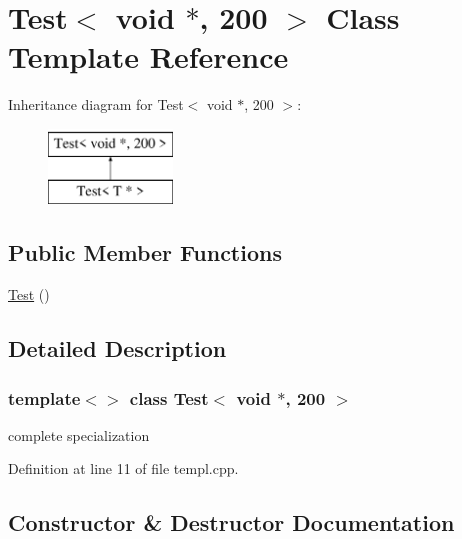 \hypertarget{class_test_3_01void_01_5_00_01200_01_4}{}\section{Test$<$ void $\ast$, 200 $>$ Class Template Reference}
\label{class_test_3_01void_01_5_00_01200_01_4}
Inheritance diagram for Test$<$ void $\ast$, 200 $>$\+:\begin{figure}[H]
\begin{center}
\leavevmode
\includegraphics[height=2.000000cm]{class_test_3_01void_01_5_00_01200_01_4}
\end{center}
\end{figure}
\subsection*{Public Member Functions}
\begin{DoxyCompactItemize}
\item 
\hyperlink{class_test_3_01void_01_5_00_01200_01_4_a350e5417b9f48c2f7b98937514b03da2}{Test} ()
\end{DoxyCompactItemize}


\subsection{Detailed Description}
\subsubsection*{template$<$$>$\newline
class Test$<$ void $\ast$, 200 $>$}

complete specialization 

Definition at line 11 of file templ.\+cpp.



\subsection{Constructor \& Destructor Documentation}
\mbox{\label{class_test_3_01void_01_5_00_01200_01_4_a350e5417b9f48c2f7b98937514b03da2}} 
